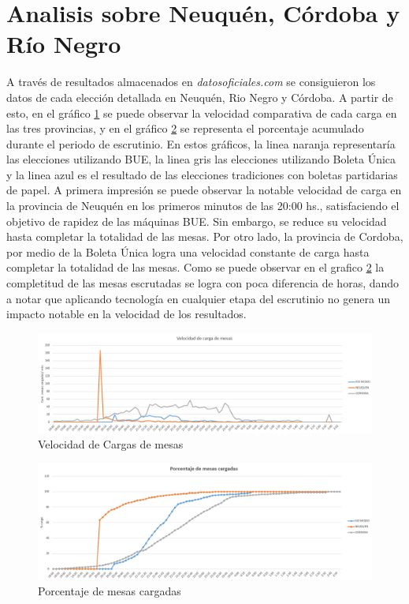 \section{Analisis sobre Neuquén, Córdoba y Río Negro}
A través de resultados almacenados en \textit{datosoficiales.com} se consiguieron los datos de cada elección detallada en Neuquén, Rio Negro y Córdoba. \newline
A partir de esto, en el gráfico \ref{fig:velocidad} se puede observar la velocidad comparativa de cada carga en las tres provincias, y en el gráfico \ref{fig:acumulado} se representa el porcentaje acumulado durante el periodo de escrutinio. En estos gráficos, la linea naranja representaría las elecciones utilizando BUE, la linea gris las elecciones utilizando Boleta Única y la linea azul es el resultado de las elecciones tradiciones con boletas partidarias de papel. \newline
A primera impresión se puede observar la notable velocidad de carga en la provincia de Neuquén en los primeros minutos de las 20:00 hs., satisfaciendo el objetivo de rapidez de las máquinas BUE. Sin embargo, se reduce su velocidad hasta completar la totalidad de las mesas. Por otro lado, la provincia de Cordoba, por medio de la Boleta Única logra una velocidad constante de carga hasta completar la totalidad de las mesas. Como se puede observar en el grafico \ref{fig:acumulado} la completitud de las mesas escrutadas se logra con poca diferencia de horas, dando a notar que aplicando tecnología en cualquier etapa del escrutinio no genera un impacto notable en la velocidad de los resultados. 
\newline


\begin{figure}[h!]
  \includegraphics[width=\textwidth]{grafico_velocidad_carga.png}
  \caption{Velocidad de Cargas de mesas}
  \label{fig:velocidad}
\end{figure}
\begin{figure}[h!]
  \includegraphics[width=\textwidth]{carga_mesas.png}
  \caption{Porcentaje de mesas cargadas}
  \label{fig:acumulado}
\end{figure}


